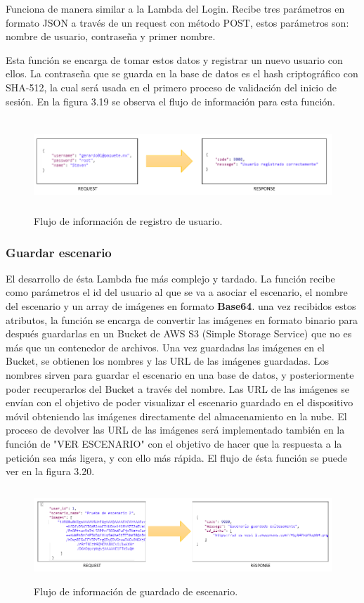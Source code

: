 Funciona de manera similar a la Lambda del Login. Recibe tres parámetros en formato JSON a través de un request con método POST, estos parámetros son: nombre de usuario, contraseña y primer nombre. \par
Esta función se encarga de tomar estos datos y registrar un nuevo usuario con ellos. La contraseña que se guarda en la base de datos es el hash criptográfico con SHA-512, la cual será usada en el primero proceso de validación del inicio de sesión. En la figura 3.19 se observa el flujo de información para esta función.
\begin{figure}[h!]
	\centering
	\includegraphics[width=15cm,height=3.5cm]{imagenes/desarrollo/arquitectura/REGISTER_SUCCESS.png}
	\caption{Flujo de información de registro de usuario.}
	\label{fig:regsuccess}
\end{figure}
\par

\subsubsection{Guardar escenario}
El desarrollo de ésta Lambda fue más complejo y tardado. La función recibe como parámetros el id del usuario al que se va a asociar el escenario, el nombre del escenario y un array de imágenes en formato \textbf{Base64}. una vez recibidos estos atributos, la función se encarga de convertir las imágenes en formato binario para después guardarlas en un Bucket de AWS S3 (Simple Storage Service) que no es más que un contenedor de archivos. Una vez guardadas las imágenes en el Bucket, se obtienen los nombres y las URL de las imágenes guardadas. Los nombres sirven para guardar el escenario en una base de datos, y posteriormente poder recuperarlos del Bucket a través del nombre. Las URL de las imágenes se envían con el objetivo de poder visualizar el escenario guardado en el dispositivo móvil obteniendo las imágenes directamente del almacenamiento en la nube. El proceso de devolver las URL de las imágenes será implementado también en la función de "VER ESCENARIO" con el objetivo de hacer que la respuesta a la petición sea más ligera, y con ello más rápida. El flujo de ésta función se puede ver en la figura 3.20.

\begin{figure}[h!]
	\centering
	\includegraphics[width=15cm,height=3.5cm]{imagenes/desarrollo/arquitectura/STORESC_SUCCESS.png}
	\caption{Flujo de información de guardado de escenario.}
	\label{fig:regsuccess}
\end{figure}